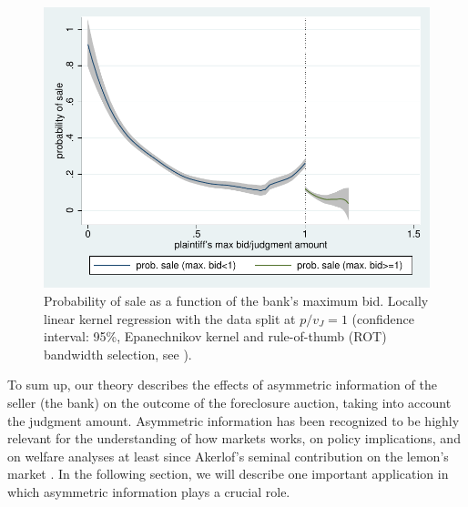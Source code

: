 \documentclass[11pt,twopage]{article}
\begin{document}
\begin{figure}
	\begin{center}
		\includegraphics[width=0.6 \textwidth]{graphics/simple_discontinuity}
		\caption{Probability of sale as a function of the bank's maximum bid. Locally linear kernel regression with the data split at $p/v_J=1$ (confidence interval: 95\%, Epanechnikov kernel and rule-of-thumb (ROT) bandwidth selection, see \cite{fan1996local}).\label{fig:discontinuity-data}}
	\end{center}
\end{figure}


To sum up, our theory describes the effects of asymmetric information of the
seller (the bank) on the outcome of the foreclosure auction, taking
into account the judgment amount. Asymmetric information has been
recognized to be highly relevant for the understanding of how markets
works, on policy implications, and on welfare analyses at least since
Akerlof's seminal contribution on the lemon's market \citep{akerlof1970market}. In the following section, we will describe one important application in which asymmetric information plays a crucial role.

\end{document}
